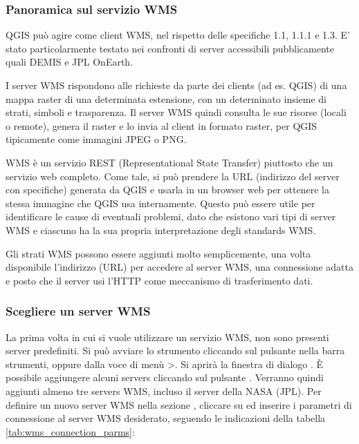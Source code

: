 \subsubsection{Panoramica sul servizio WMS}\label{sec:ogc-wms-about}

QGIS può agire come client WMS, nel rispetto delle specifiche 1.1, 1.1.1 e 1.3.
E’ stato particolarmente testato nei confronti di server accessibili pubblicamente
quali DEMIS e JPL OnEarth.

I server WMS rispondono alle richieste da parte dei clients (ad es. QGIS) di una mappa raster
di una determinata estensione, con un determinato insieme di strati, simboli e trasparenza.
Il server WMS quindi consulta le sue risorse (locali o remote), genera il raster e lo invia
al client in formato raster, per QGIS tipicamente come immagini JPEG o PNG.

WMS è un servizio REST (Representational State Transfer) piuttosto che un servizio web completo.
Come tale, si può prendere la URL (indirizzo del server con specifiche) generata da QGIS e usarla
in un browser web per ottenere la stessa immagine che QGIS usa internamente. Questo può essere
utile per identificare le cause di eventuali problemi, dato che esistono vari tipi di server
WMS e ciascuno ha la sua propria interpretazione degli standards WMS.

Gli strati WMS possono essere aggiunti molto semplicemente, una volta
disponibile l'indirizzo (URL) per accedere al server WMS, una connessione adatta
e posto che il server usi l’HTTP come meccanismo di trasferimento dati.

\subsubsection{Scegliere un server WMS}\label{sec:ogc-wms-servers}

La prima volta in cui si vuole utilizzare un servizio WMS, non sono presenti
server predefiniti. Si può avviare lo strumento cliccando sul pulsante
 nella barra strumenti, 
oppure dalla voce di menù
>.
Si aprirà la finestra di dialogo . È
possibile aggiungere alcuni servers cliccando sul pulsante
. Verranno quindi aggiunti almeno tre
servers WMS, incluso il server della NASA (JPL). Per definire un nuovo server WMS
nella sezione , cliccare su  ed inserire
i parametri di connessione al server WMS desiderato, seguendo le indicazioni della
tabella \ref{tab:wms_connection_parms}:

